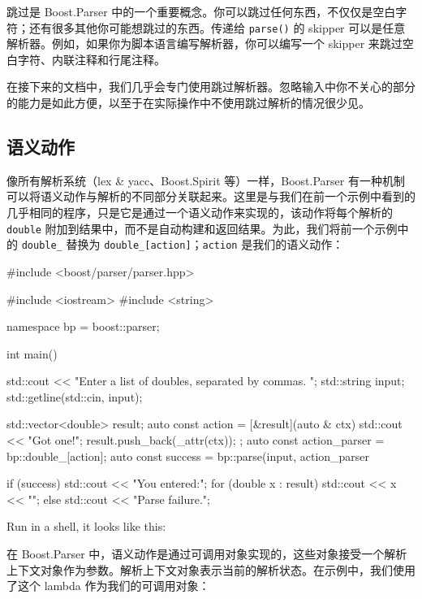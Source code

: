 跳过是 Boost.Parser 中的一个重要概念。你可以跳过任何东西，不仅仅是空白字符；还有很多其他你可能想跳过的东西。传递给 \texttt{parse()} 的 skipper 可以是任意解析器。例如，如果你为脚本语言编写解析器，你可以编写一个 skipper 来跳过空白字符、内联注释和行尾注释。

在接下来的文档中，我们几乎会专门使用跳过解析器。忽略输入中你不关心的部分的能力是如此方便，以至于在实际操作中不使用跳过解析的情况很少见。

\subsection{语义动作}

像所有解析系统（lex \& yacc、Boost.Spirit 等）一样，Boost.Parser 有一种机制可以将语义动作与解析的不同部分关联起来。这里是与我们在前一个示例中看到的几乎相同的程序，只是它是通过一个语义动作来实现的，该动作将每个解析的 \texttt{double} 附加到结果中，而不是自动构建和返回结果。为此，我们将前一个示例中的 \texttt{double\_} 替换为 \texttt{double\_{[}action{]}}；\texttt{action} 是我们的语义动作：

\begin{code}
#include <boost/parser/parser.hpp>

#include <iostream>
#include <string>


namespace bp = boost::parser;

int main()
{
    std::cout << "Enter a list of doubles, separated by commas. ";
    std::string input;
    std::getline(std::cin, input);

    std::vector<double> result;
    auto const action = [&result](auto & ctx) {
        std::cout << "Got one!\n";
        result.push_back(_attr(ctx));
    };
    auto const action_parser = bp::double_[action];
    auto const success = bp::parse(input, action_parser %

    if (success) {
        std::cout << "You entered:\n";
        for (double x : result) {
            std::cout << x << "\n";
        }
    } else {
        std::cout << "Parse failure.\n";
    }
}
\end{code}

Run in a shell, it looks like this:


在 Boost.Parser 中，语义动作是通过可调用对象实现的，这些对象接受一个解析上下文对象作为参数。解析上下文对象表示当前的解析状态。在示例中，我们使用了这个 lambda 作为我们的可调用对象：

